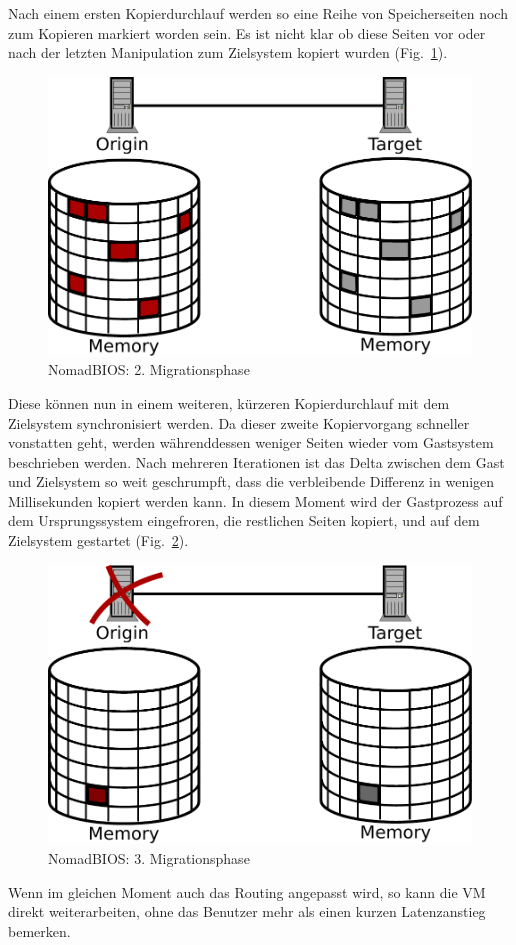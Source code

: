 Nach einem ersten Kopierdurchlauf werden so eine Reihe von
Speicherseiten noch zum Kopieren markiert worden sein. Es ist nicht
klar ob diese Seiten vor oder nach der letzten Manipulation zum
Zielsystem kopiert wurden (Fig.~\ref{fig:nomad_stage2}).
\begin{figure}[h]
  \centering
  \includegraphics[width=0.7\linewidth]{images/nomad_stage2}
  \caption{NomadBIOS: 2. Migrationsphase}
  \label{fig:nomad_stage2}
\end{figure}
Diese können nun in einem weiteren, kürzeren Kopierdurchlauf mit dem
Zielsystem synchronisiert werden. Da dieser zweite Kopiervorgang
schneller vonstatten geht, werden währenddessen weniger Seiten wieder
vom Gastsystem beschrieben werden. Nach mehreren Iterationen ist das
Delta zwischen dem Gast und Zielsystem so weit geschrumpft, dass die
verbleibende Differenz in wenigen Millisekunden kopiert werden
kann. In diesem Moment wird der Gastprozess auf dem Ursprungssystem
eingefroren, die restlichen Seiten kopiert, und auf dem Zielsystem
gestartet (Fig.~\ref{fig:nomad_stage3}).
\begin{figure}[b]
  \centering
  \includegraphics[width=0.7\linewidth]{images/nomad_stage3}
  \caption{NomadBIOS: 3. Migrationsphase}
  \label{fig:nomad_stage3}
\end{figure}
Wenn im gleichen Moment auch das Routing angepasst wird, so
kann die VM direkt weiterarbeiten, ohne das Benutzer mehr als einen
kurzen Latenzanstieg bemerken.

